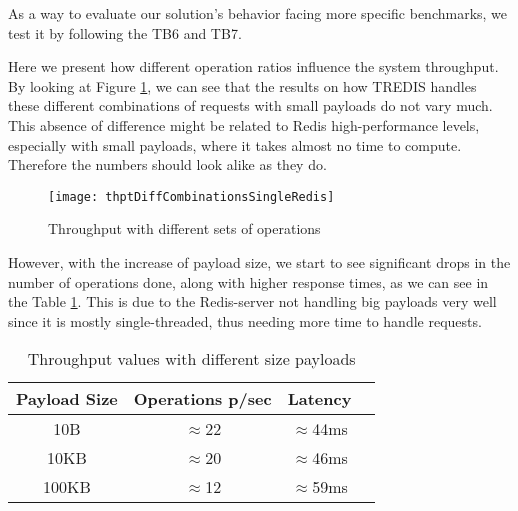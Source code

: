 As a way to evaluate our solution's behavior facing more specific benchmarks, we test it by following the TB6 and TB7. 

Here we present how different operation ratios influence the system throughput. By looking at Figure \ref{fig:thptDiffCombinationsSingleRedis}, we can see that the results on how TREDIS handles these different combinations of requests with small payloads do not vary much. This absence of difference might be related to Redis high-performance levels, especially with small payloads, where it takes almost no time to compute. Therefore the numbers should look alike as they do.  

\begin{figure}[htbp]
	\centering
	{\texttt{[image: thptDiffCombinationsSingleRedis]}}
	\caption{Throughput with different sets of operations}
	\label{fig:thptDiffCombinationsSingleRedis}
\end{figure}

However, with the increase of payload size, we start to see significant drops in the number of operations done, along with higher response times, as we can see in the Table \ref{table:throughputPayloads}. This is due to the Redis-server not handling big payloads very well since it is mostly single-threaded, thus needing more time to handle requests.

\begin{table}[ht]
	\caption{Throughput values with different size payloads} %
	\centering %
	\begin{tabular}{c c c c} %
		\hline\hline %
		\textbf{Payload Size} & \textbf{Operations p/sec} & \textbf{Latency}\\ [0.5ex] %
		\hline
		10B & $\approx$22 & $\approx$44ms\\
		\hline
		10KB & $\approx$20 & $\approx$46ms\\
		\hline %
		100KB & $\approx$12 & $\approx$59ms\\ [1ex] %
		\hline %
	\end{tabular}
	\label{table:throughputPayloads} %
\end{table} 

